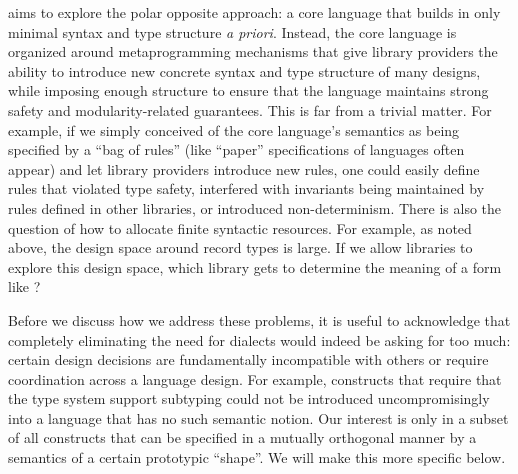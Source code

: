 {\Verse} aims to explore the polar opposite approach: a core language that builds in only minimal syntax and type structure \emph{a priori}. Instead, the core language is organized around metaprogramming mechanisms that give library providers the ability to introduce new concrete syntax and type structure of many designs, while imposing enough structure to ensure that the language maintains strong safety and modularity-related guarantees. This is far from a trivial matter.
For example, if we simply conceived of the core language's semantics as being specified by a ``bag of rules'' (like ``paper'' specifications of languages often appear) and let library providers introduce new rules, one could easily define rules that violated type safety, interfered with invariants being maintained by rules defined in other libraries, or introduced non-determinism. There is also the question of how to allocate finite syntactic resources. For example, as noted above, the design space around record types is large. If we allow libraries to explore this design space, which library gets to determine the meaning of a form like ? 


Before we discuss how we address these problems, it is useful to acknowledge that completely eliminating the need for dialects would indeed be asking for too much: certain design decisions are fundamentally incompatible with others or require coordination across a language design. For example, constructs that require that the type system support subtyping could not be introduced uncompromisingly into a language that has no such semantic notion. Our interest is only in a subset of all constructs that can be specified in a mutually orthogonal manner by a semantics of a certain prototypic ``shape''. We will make this more specific below. %

